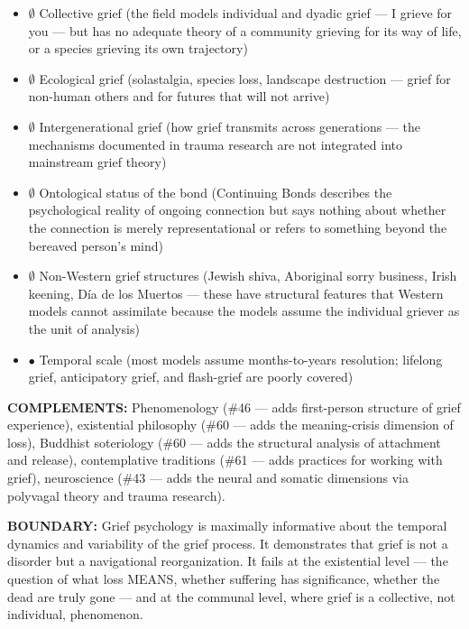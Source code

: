 \begin{itemize}[nosep,leftmargin=*]
  \item $\emptyset$ Collective grief (the field models individual and dyadic grief — I grieve for you — but has no adequate theory of a community grieving for its way of life, or a species grieving its own trajectory)
  \item $\emptyset$ Ecological grief (solastalgia, species loss, landscape destruction — grief for non-human others and for futures that will not arrive)
  \item $\emptyset$ Intergenerational grief (how grief transmits across generations — the mechanisms documented in trauma research are not integrated into mainstream grief theory)
  \item $\emptyset$ Ontological status of the bond (Continuing Bonds describes the psychological reality of ongoing connection but says nothing about whether the connection is merely representational or refers to something beyond the bereaved person's mind)
  \item $\emptyset$ Non-Western grief structures (Jewish shiva, Aboriginal sorry business, Irish keening, Día de los Muertos — these have structural features that Western models cannot assimilate because the models assume the individual griever as the unit of analysis)
  \item $\bullet$ Temporal scale (most models assume months-to-years resolution; lifelong grief, anticipatory grief, and flash-grief are poorly covered)
\end{itemize}


\textbf{COMPLEMENTS:} Phenomenology (\#46 — adds first-person structure of grief experience), existential philosophy (\#60 — adds the meaning-crisis dimension of loss), Buddhist soteriology (\#60 — adds the structural analysis of attachment and release), contemplative traditions (\#61 — adds practices for working with grief), neuroscience (\#43 — adds the neural and somatic dimensions via polyvagal theory and trauma research).


\textbf{BOUNDARY:} Grief psychology is maximally informative about the temporal dynamics and variability of the grief process. It demonstrates that grief is not a disorder but a navigational reorganization. It fails at the existential level — the question of what loss MEANS, whether suffering has significance, whether the dead are truly gone — and at the communal level, where grief is a collective, not individual, phenomenon.



